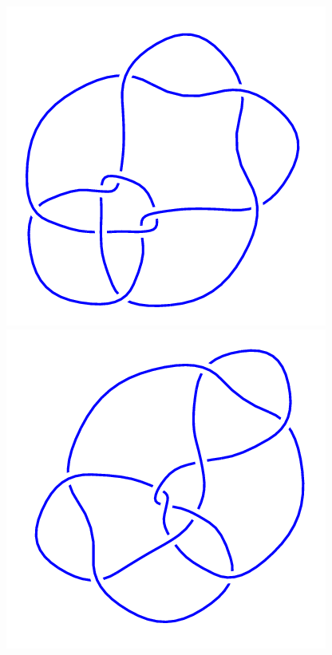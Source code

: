 \begin{figure}[H]
\begin{minipage}[b]{.18\linewidth}
    \end{minipage}
    \begin{minipage}[b]{.18\linewidth}
        \centering
        \includegraphics[width=\linewidth]{../data/10_104.png}
    \end{minipage}
    \begin{minipage}[b]{.18\linewidth}
        \centering
        \includegraphics[width=\linewidth]{../data/10_105.png}

\end{minipage}
\end{figure}
